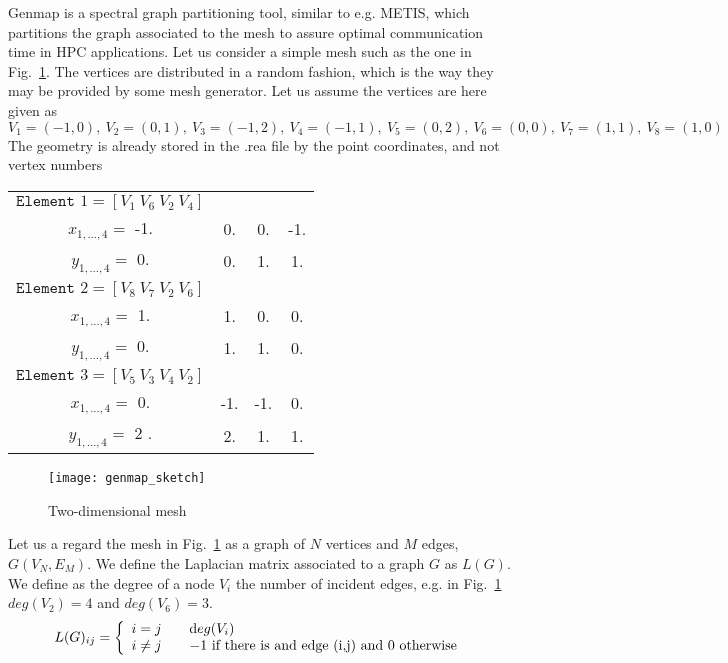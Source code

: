 Genmap is a spectral graph partitioning tool, similar to e.g. METIS, which partitions the graph associated to the mesh to assure optimal communication time in HPC applications. Let us consider a simple mesh such as the one in Fig.~\ref{fig:genmap}. The vertices are distributed in a random fashion, which is the way they may be provided by some mesh generator. Let us assume the vertices are here given as
\[V_1=(-1,0),\ V_2=(0,1),\ V_3=(-1,2),\ V_4=(-1,1),\ V_5=(0,2),\ V_6=(0,0),\ V_7=(1,1),\ V_8=(1,0)\]
The geometry is already stored in the .rea file by the point coordinates, and not vertex numbers
\begin{tabular}{c c c c}
  \(\texttt{Element } 1=[V_1\ V_6\ V_2\ V_4]\)&&&\\
  \(x_{1,\ldots,4}=\) -1. & 0. & 0. & -1.\\
  \(y_{1,\ldots,4}=\) 0.  & 0. & 1. &1.\\
  \(\texttt{Element } 2=[V_8\ V_7\ V_2\ V_6]\)&&&\\
  \(x_{1,\ldots,4}=\) 1. & 1. & 0. & 0.\\
  \(y_{1,\ldots,4}=\) 0. & 1. & 1. &0.\\
  \(\texttt{Element } 3=[V_5\ V_3\ V_4\ V_2]\)&&&\\
  \(x_{1,\ldots,4}=\) 0. & -1. & -1. & 0.\\
  \(y_{1,\ldots,4}=\) 2 .& 2.  & 1.  &1.\\
  \end{tabular}

\begin{figure}
\centering
\texttt{[image: genmap\_sketch]}
\caption{Two-dimensional mesh}
\label{fig:genmap}
\end{figure}

Let us a regard the mesh in Fig.~\ref{fig:genmap} as a graph of \(N\) vertices and \(M\) edges, \(G(V_N,E_M)\). We define the Laplacian matrix associated to a graph \(G\) as \(L(G)\). We define as the degree of a node \(V_i\) the number of incident edges, e.g. in Fig.~\ref{fig:genmap} \(deg(V_2)=4\) and \(deg(V_6)=3\).
\begin{equation}
L(G)_{ij}= \left\{
  \begin{array}{l l}
    i=j & \quad \mathrm deg(V_i)\\
    i\neq j & \quad -1 \text{ if there is and edge (i,j) and } 0 \text{ otherwise}
  \end{array} \right .
\end{equation}

